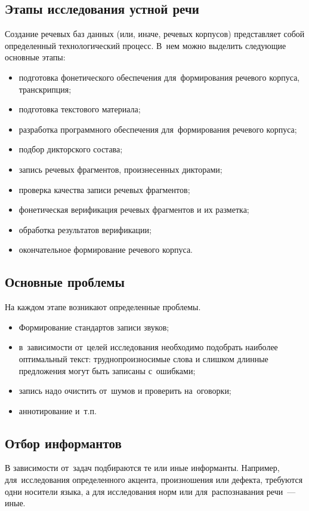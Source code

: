 \documentclass[12pt]{article}
\theoremstyle{definition}
\theoremstyle{remark}
\numberwithin{equation}{section}
\begin{document}
\subsection{Этапы исследования устной речи}
Создание речевых баз данных (или, иначе, речевых корпусов) представляет 
собой определенный технологический процесс. В~нем можно выделить следующие 
основные этапы:
\begin{itemize}
    \item подготовка фонетического обеспечения для~формирования речевого 
    корпуса, транскрипция;
    \item подготовка текстового материала;
    \item разработка программного обеспечения для~формирования речевого 
    корпуса;
    \item подбор дикторского состава;
    \item запись речевых фрагментов, произнесенных дикторами;
    \item проверка качества записи речевых фрагментов;
    \item фонетическая верификация речевых фрагментов и их разметка;
    \item обработка результатов верификации;
    \item окончательное формирование речевого корпуса.
\end{itemize}
\subsection{Основные проблемы}
На каждом этапе возникают определенные проблемы. 
\begin{itemize}
    \item Формирование стандартов записи звуков;
    \item в~зависимости от~целей исследования необходимо подобрать
    наиболее оптимальный текст: труднопроизносимые слова и слишком длинные
    предложения могут быть записаны с~ошибками;
    \item запись надо очистить от~шумов и проверить на~оговорки;
    \item аннотирование и~т.п.
\end{itemize}

\subsection{Отбор информантов}
В зависимости от~задач подбираются те или иные информанты. Например,
для~исследования определенного акцента, произношения или дефекта, 
требуются одни носители языка, а для исследования норм или для~распознавания
речи~--- иные.
\end{document}
